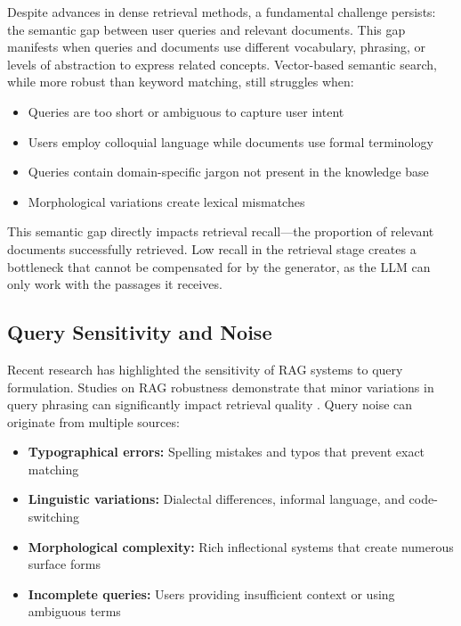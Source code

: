 Despite advances in dense retrieval methods, a fundamental challenge persists: the semantic gap between user queries and relevant documents. This gap manifests when queries and documents use different vocabulary, phrasing, or levels of abstraction to express related concepts. Vector-based semantic search, while more robust than keyword matching, still struggles when:

\begin{itemize}
    \item Queries are too short or ambiguous to capture user intent
    \item Users employ colloquial language while documents use formal terminology
    \item Queries contain domain-specific jargon not present in the knowledge base
    \item Morphological variations create lexical mismatches
\end{itemize}

This semantic gap directly impacts retrieval recall—the proportion of relevant documents successfully retrieved. Low recall in the retrieval stage creates a bottleneck that cannot be compensated for by the generator, as the LLM can only work with the passages it receives.

\subsection{Query Sensitivity and Noise}

Recent research has highlighted the sensitivity of RAG systems to query formulation. Studies on RAG robustness demonstrate that minor variations in query phrasing can significantly impact retrieval quality \cite{perin_2025_investigating}. Query noise can originate from multiple sources:

\begin{itemize}
    \item \textbf{Typographical errors:} Spelling mistakes and typos that prevent exact matching
    \item \textbf{Linguistic variations:} Dialectal differences, informal language, and code-switching
    \item \textbf{Morphological complexity:} Rich inflectional systems that create numerous surface forms
    \item \textbf{Incomplete queries:} Users providing insufficient context or using ambiguous terms
\end{itemize}

